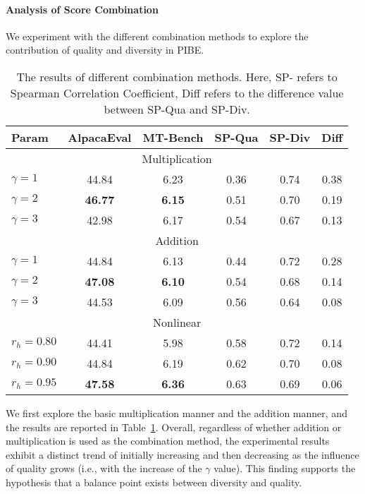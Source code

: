 \paragraph{\textbf{Analysis of Score Combination}}
\label{exp: combination}
We experiment with the different combination methods to explore the contribution of quality and diversity in PIBE. 

\begin{table}[htbp]
    \centering
    \small
    \setlength{\tabcolsep}{2pt} 
    \begin{tabular}{l|cc|ccc}
    \toprule
    Param & AlpacaEval & MT-Bench & SP-Qua & SP-Div & Diff \\
    \midrule
    \multicolumn{6}{c}{Multiplication} \\
    \midrule
    $\gamma=1$    & 44.84 & 6.23 & 0.36 & 0.74 & 0.38 \\
    $\gamma=2$    & \textbf{46.77} & \textbf{6.15} & 0.51 & 0.70 & 0.19 \\
    $\gamma=3$    & 42.98 & 6.17 & 0.54 & 0.67 & 0.13 \\
    \midrule
    \multicolumn{6}{c}{Addition} \\
    \midrule
    $\gamma=1$    & 44.84 & 6.13 & 0.44 & 0.72 & 0.28 \\
    $\gamma=2$    & \textbf{47.08} & \textbf{6.10} & 0.54 & 0.68 & 0.14 \\
    $\gamma=3$    & 44.53 & 6.09 & 0.56 & 0.64 & 0.08 \\
    \midrule
    \multicolumn{6}{c}{Nonlinear} \\
    \midrule
    $r_h=0.80$ & 44.41 & 5.98 & 0.58 & 0.72 & 0.14 \\
    $r_h=0.90$ & 44.84 & 6.19 & 0.62 & 0.70 & 0.08 \\
    $r_h=0.95$ & \textbf{47.58} & \textbf{6.36} & 0.63 & 0.69 & 0.06 \\
    \bottomrule
\end{tabular}
\caption{The results of different combination methods. Here, SP- refers to Spearman Correlation Coefficient, Diff refers to the difference value between SP-Qua and SP-Div.}
\label{tab: result-combination}
\end{table}

We first explore the basic multiplication manner and the addition manner, and the results are reported in Table~\ref{tab: result-combination}. Overall, regardless of whether addition or multiplication is used as the combination method, the experimental results exhibit a distinct trend of initially increasing and then decreasing as the influence of quality grows (i.e., with the increase of the $ \gamma $ value). This finding supports the hypothesis that a balance point exists between diversity and quality.

